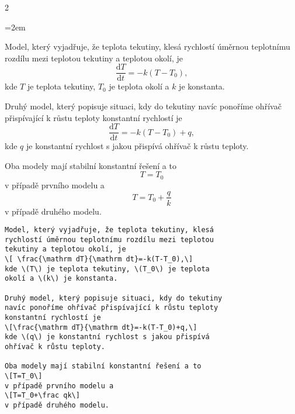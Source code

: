 \documentclass[10pt]{article}
\begin{document}
\begin{multicols}2

      \begin{minipage}{1.0\linewidth}
    \parindent=2em

      Model, který vyjadřuje, že teplota tekutiny, klesá 
rychlostí úměrnou teplotnímu rozdílu mezi teplotou 
tekutiny a teplotou okolí, je
\[ \frac{\mathrm dT}{\mathrm dt}=-k(T-T_0),\]
kde \(T\) je teplota tekutiny, \(T_0\) je teplota 
okolí a \(k\) je konstanta.

Druhý model, který popisuje situaci, kdy do tekutiny 
navíc ponoříme ohřívač přispívající k růstu teploty 
konstantní rychlostí je 
\[\frac{\mathrm dT}{\mathrm dt}=-k(T-T_0)+q,\] 
kde \(q\) je konstantní rychlost s jakou přispívá 
ohřívač k růstu teploty.

Oba modely mají stabilní konstantní řešení a to 
\[T=T_0\] v případě prvního modelu a 
\[T=T_0+\frac qk\] v případě druhého modelu.
  \end{minipage}


\begin{lstlisting}
Model, který vyjadřuje, že teplota tekutiny, klesá 
rychlostí úměrnou teplotnímu rozdílu mezi teplotou 
tekutiny a teplotou okolí, je
\[ \frac{\mathrm dT}{\mathrm dt}=-k(T-T_0),\]
kde \(T\) je teplota tekutiny, \(T_0\) je teplota 
okolí a \(k\) je konstanta.

Druhý model, který popisuje situaci, kdy do tekutiny 
navíc ponoříme ohřívač přispívající k růstu teploty 
konstantní rychlostí je 
\[\frac{\mathrm dT}{\mathrm dt}=-k(T-T_0)+q,\] 
kde \(q\) je konstantní rychlost s jakou přispívá 
ohřívač k růstu teploty.

Oba modely mají stabilní konstantní řešení a to 
\[T=T_0\] 
v případě prvního modelu a 
\[T=T_0+\frac qk\] 
v případě druhého modelu.
\end{lstlisting}


  
\end{multicols}

\newpage
\end{document}

